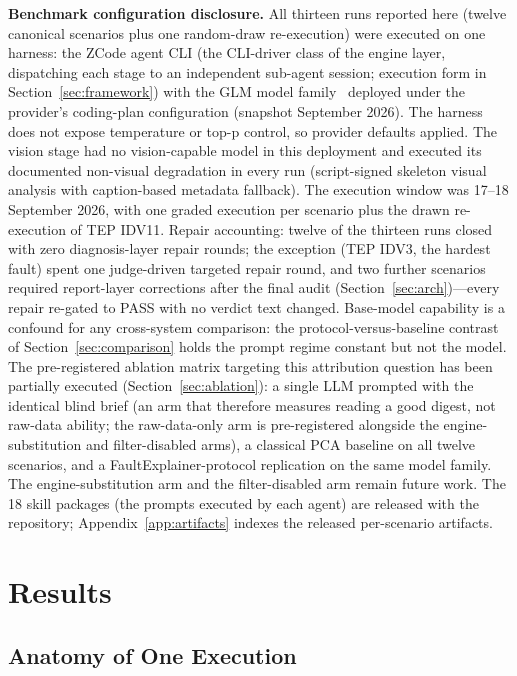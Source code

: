\documentclass[preprint,12pt]{elsarticle}
\begin{document}
\textbf{Benchmark configuration disclosure.} All thirteen runs reported here (twelve canonical scenarios plus one random-draw re-execution) were executed on one harness: the ZCode agent CLI (the CLI-driver class of the engine layer, dispatching each stage to an independent sub-agent session; execution form in Section~\ref{sec:framework}) with the GLM model family~\cite{glm2024chatglm} deployed under the provider's coding-plan configuration (snapshot September 2026). The harness does not expose temperature or top-p control, so provider defaults applied. The vision stage had no vision-capable model in this deployment and executed its documented non-visual degradation in every run (script-signed skeleton visual analysis with caption-based metadata fallback). The execution window was 17--18 September 2026, with one graded execution per scenario plus the drawn re-execution of TEP IDV11. Repair accounting: twelve of the thirteen runs closed with zero diagnosis-layer repair rounds; the exception (TEP IDV3, the hardest fault) spent one judge-driven targeted repair round, and two further scenarios required report-layer corrections after the final audit (Section~\ref{sec:arch})---every repair re-gated to PASS with no verdict text changed. Base-model capability is a confound for any cross-system comparison: the protocol-versus-baseline contrast of Section~\ref{sec:comparison} holds the prompt regime constant but not the model. The pre-registered ablation matrix targeting this attribution question has been partially executed (Section~\ref{sec:ablation}): a single LLM prompted with the identical blind brief (an arm that therefore measures reading a good digest, not raw-data ability; the raw-data-only arm is pre-registered alongside the engine-substitution and filter-disabled arms), a classical PCA baseline on all twelve scenarios, and a FaultExplainer-protocol replication on the same model family. The engine-substitution arm and the filter-disabled arm remain future work. The 18 skill packages (the prompts executed by each agent) are released with the repository; Appendix~\ref{app:artifacts} indexes the released per-scenario artifacts.

\section{Results}
\label{sec:results}

\subsection{Anatomy of One Execution}
\label{sec:anatomy}
\end{document}
